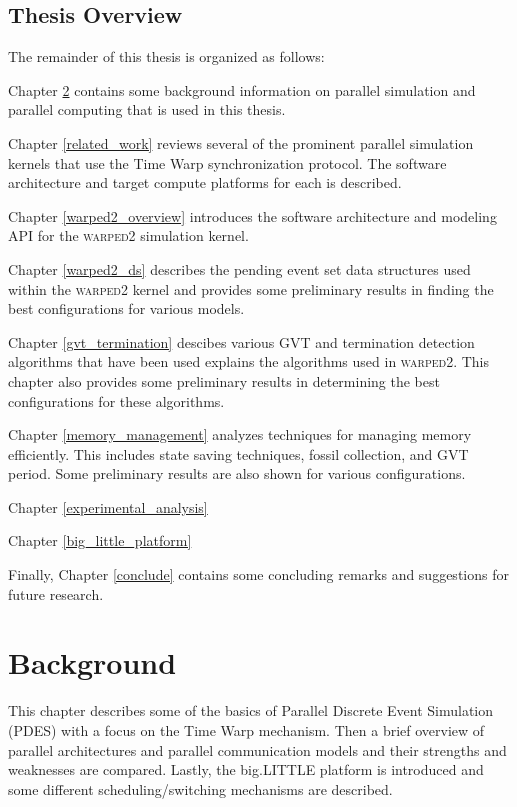 \documentclass[11pt]{book}
\begin{document}
\section{Thesis Overview}

The remainder of this thesis is organized as follows:

Chapter \ref{background} contains some background information on parallel simulation and
parallel computing that is used in this thesis.

Chapter \ref{related_work} reviews several of the prominent parallel simulation kernels
that use the Time Warp synchronization protocol.  The software architecture and target
compute platforms for each is described.

Chapter \ref{warped2_overview} introduces the software architecture and modeling API for
the \textsc{warped2} simulation kernel.

Chapter \ref{warped2_ds} describes the pending event set data structures used within
the \textsc{warped2} kernel and provides some preliminary results in finding the best
configurations for various models.

Chapter \ref{gvt_termination} descibes various GVT and termination detection algorithms that
have been used explains the algorithms used in \textsc{warped2}. This chapter also provides
some preliminary results in determining the best configurations for these algorithms.

Chapter \ref{memory_management} analyzes techniques for managing memory efficiently. This
includes state saving techniques, fossil collection, and GVT period. Some preliminary results
are also shown for various configurations.

Chapter \ref{experimental_analysis}

Chapter \ref{big_little_platform}

Finally, Chapter \ref{conclude} contains some concluding remarks and suggestions for future
research.



\chapter{Background}\label{background}

This chapter describes some of the basics of Parallel Discrete Event Simulation (PDES) with
a focus on the Time Warp mechanism. Then a brief overview of parallel architectures and
parallel communication models and their strengths and weaknesses are compared. Lastly, the
big.LITTLE platform is introduced and some different scheduling/switching mechanisms are
described.
\end{document}
